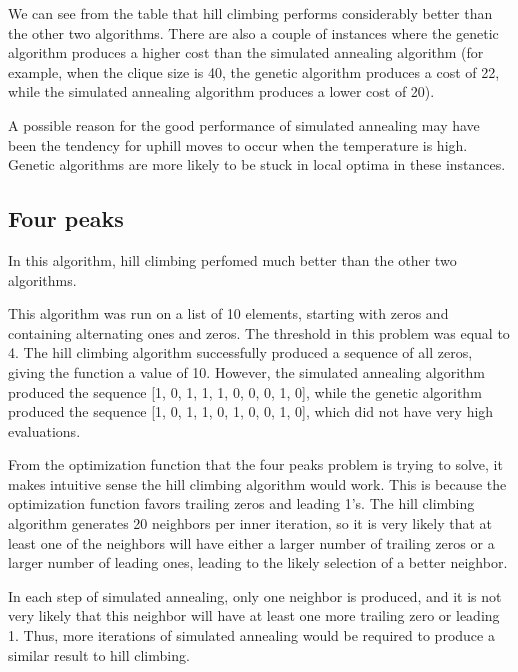 \documentclass[11pt]{article}
\begin{document}
        We can see from the table that hill climbing performs considerably better than the other two algorithms.
        There are also a couple of instances where the genetic algorithm produces a higher cost than the simulated
        annealing algorithm (for example, when the clique size is 40, the genetic algorithm produces
        a cost of 22, while the simulated annealing algorithm produces a lower cost of 20). 

        A possible reason for the good performance of simulated annealing may have been the tendency for
        uphill moves to occur when the temperature is high. Genetic algorithms are more likely to be stuck in
        local optima in these instances.

        \subsection{Four peaks}

        In this algorithm, hill climbing perfomed much better than the other two algorithms.

        This algorithm was run on a list of 10 elements, starting with zeros and containing alternating
        ones and zeros. The threshold in this problem was equal to 4. The hill climbing algorithm successfully
        produced a sequence of all zeros, giving the function a value of 10. However, the
        simulated annealing algorithm produced the sequence [1, 0, 1, 1, 1, 0, 0, 0, 1, 0],
        while the genetic algorithm produced the sequence [1, 0, 1, 1, 0, 1, 0, 0, 1, 0],
        which did not have very high evaluations.

        From the optimization function that the four peaks problem is trying to solve, it makes
        intuitive sense the hill climbing algorithm would work. This is because the optimization
        function favors trailing zeros and leading 1's. The hill climbing algorithm generates 20
        neighbors per inner iteration, so it is very likely that at least one of the neighbors will
        have either a larger number of trailing zeros or a larger number of leading ones, leading
        to the likely selection of a better neighbor.

        In each step of simulated annealing, only one neighbor is produced, and it is not very likely that this
        neighbor will have at least one more trailing zero or leading 1. Thus, more iterations of simulated annealing
        would be required to produce a similar result to hill climbing.
\end{document}
